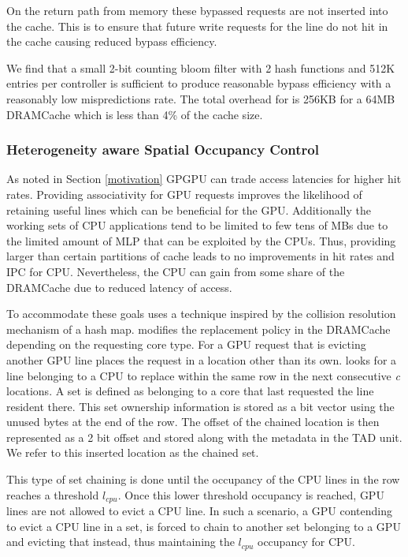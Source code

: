 On the return path from memory these bypassed requests are not inserted into the cache. This is to ensure that future write requests for the line do not hit in the cache causing reduced bypass efficiency.
\par We find that a small 2-bit counting bloom filter with 2 hash functions and 512K entries per controller is sufficient to produce reasonable bypass efficiency with a reasonably low mispredictions rate. The total overhead for \bypassname is 256KB for a 64MB DRAMCache which is less than 4\% of the cache size.


\subsubsection{Heterogeneity aware Spatial Occupancy Control}
As noted in Section \ref{motivation} GPGPU can trade access latencies for higher hit rates. Providing associativity for GPU requests improves the likelihood of retaining useful lines which can be beneficial for the GPU. Additionally the working sets of CPU applications tend to be limited to few tens of MBs due to the limited amount of MLP that can be exploited by the CPUs. Thus, providing larger than certain partitions of cache leads to no improvements in hit rates and IPC for CPU. Nevertheless, the CPU can gain from some share of the DRAMCache due to reduced latency of access.
\par To accommodate these goals \cachename uses a technique inspired by the collision resolution mechanism of a hash map. \cachename modifies the replacement policy in the DRAMCache depending on the requesting core type. For a GPU request that is evicting another GPU line \cachename places the request in a location other than its own. \cachename looks for a line belonging to a CPU to replace within the same row in the next consecutive \textit{c} locations. A set is defined as belonging to a core that last requested the line resident there. This set ownership information is stored as a bit vector using the unused bytes at the end of the row. The offset of the chained location is then represented as a 2 bit offset and stored along with the metadata in the TAD unit. We refer to this inserted location as the chained set. 
\par This type of set chaining is done until the occupancy of the CPU lines in the row reaches a threshold \textit{$l_{cpu}$}. Once this lower threshold occupancy is reached, GPU lines are not allowed to evict a CPU line. In such a scenario, a GPU contending to evict a CPU line in a set, is forced to chain to another set belonging to a GPU and evicting that instead, thus maintaining the \textit{$l_{cpu}$} occupancy for CPU. 
